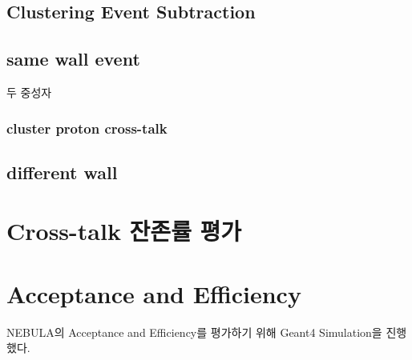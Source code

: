\subsection{Clustering Event Subtraction}

\subsection{same wall event}
두 중성자

\subsubsection{cluster proton cross-talk}


\subsection{different wall}
\section{Cross-talk 잔존률 평가}

\section{Acceptance and Efficiency}

NEBULA의 Acceptance and Efficiency를 평가하기 위해 Geant4 Simulation을 진행했다. 